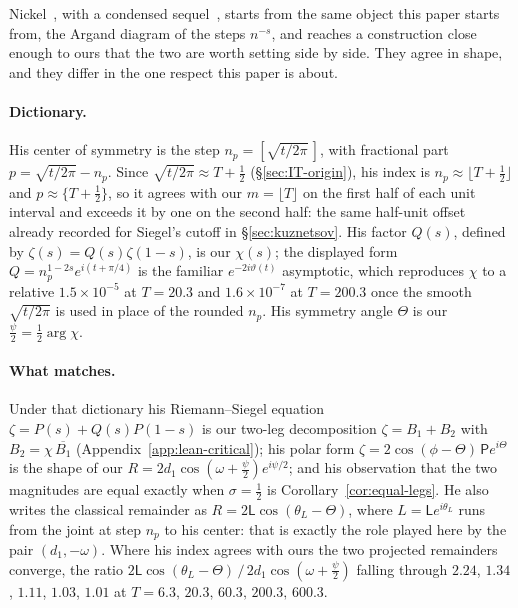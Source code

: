 \documentclass[11pt]{article}
\theoremstyle{definition}
\begin{document}
Nickel~\cite{Nickel2013}, with a condensed sequel~\cite{Nickel2015}, starts
from the same object this paper starts from,
the Argand diagram of the steps $n^{-s}$, and reaches a construction close
enough to ours that the two are worth setting side by side. They agree in
shape, and they differ in the one respect this paper is about.

\paragraph{Dictionary.} His center of symmetry is the step
$n_p=[\sqrt{t/2\pi}\,]$, with fractional part $p=\sqrt{t/2\pi}-n_p$. Since
$\sqrt{t/2\pi}\approx T+\tfrac12$ (\S\ref{sec:IT-origin}), his index is
$n_p\approx\lfloor T+\tfrac12\rfloor$ and $p\approx\{T+\tfrac12\}$, so it
agrees with our $m=\lfloor T\rfloor$ on the first half of each unit interval
and exceeds it by one on the second half: the same half-unit offset already
recorded for Siegel's cutoff in \S\ref{sec:kuznetsov}. His factor $Q(s)$,
defined by $\zeta(s)=Q(s)\zeta(1-s)$, is our $\chi(s)$; the displayed form
$Q=n_p^{1-2s}e^{i(t+\pi/4)}$ is the familiar $e^{-2i\vartheta(t)}$ asymptotic,
which reproduces $\chi$ to a relative $1.5\times10^{-5}$ at $T=20.3$ and
$1.6\times10^{-7}$ at $T=200.3$ once the smooth $\sqrt{t/2\pi}$ is used in
place of the rounded $n_p$. His symmetry angle $\Theta$ is our
$\tfrac{\psi}{2}=\tfrac12\arg\chi$.

\paragraph{What matches.} Under that dictionary his Riemann--Siegel equation
$\zeta=P(s)+Q(s)P(1-s)$ is our two-leg decomposition $\zeta=B_1+B_2$ with
$B_2=\chi\,\overline{B_1}$ (Appendix~\ref{app:lean-critical}); his polar form
$\zeta=2\cos(\phi-\Theta)\,\mathsf{P}e^{i\Theta}$ is the shape of our
$R=2d_1\cos(\omega+\tfrac{\psi}{2})e^{i\psi/2}$; and his observation that the
two magnitudes are equal exactly when $\sigma=\tfrac12$ is
Corollary~\ref{cor:equal-legs}. He also writes the classical remainder as
$R=2\mathsf{L}\cos(\theta_L-\Theta)$, where $L=\mathsf{L}e^{i\theta_L}$ runs
from the joint at step $n_p$ to his center: that is exactly the role played
here by the pair $(d_1,-\omega)$. Where his index agrees with ours the two
projected remainders converge, the ratio
$2\mathsf{L}\cos(\theta_L-\Theta)\,/\,2d_1\cos(\omega+\tfrac{\psi}{2})$
falling through $2.24$, $1.34$, $1.11$, $1.03$, $1.01$ at
$T=6.3,\,20.3,\,60.3,\,200.3,\,600.3$.
\end{document}
